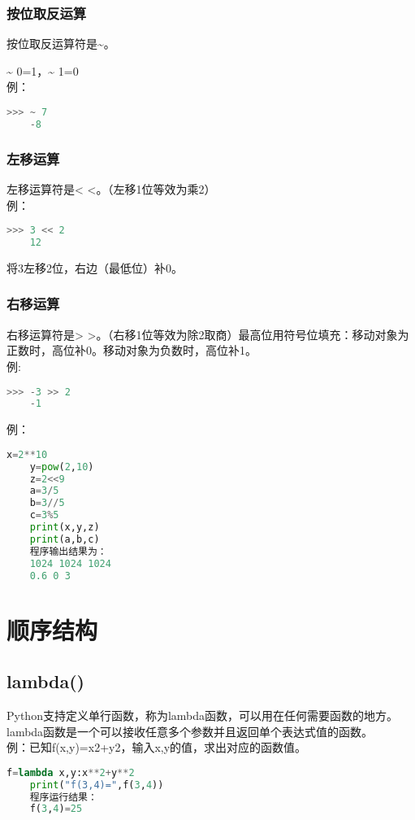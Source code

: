 \documentclass[11pt,a4paper]{article}
\begin{document}
\subsubsection{按位取反运算}

按位取反运算符是\~{}。

\~{} 0=1，\~{} 1=0\\
例：
\begin{lstlisting}[language={Python}]
    >>> ~ 7
    -8
\end{lstlisting}

\subsubsection{左移运算}

左移运算符是< <。（左移1位等效为乘2）\\
例：
\begin{lstlisting}[language={Python}]
    >>> 3 << 2
    12
\end{lstlisting}
将3左移2位，右边（最低位）补0。

\subsubsection{右移运算}

右移运算符是> >。（右移1位等效为除2取商）最高位用符号位填充：移动对象为正数时，高位补0。移动对象为负数时，高位补1。\\
例:
\begin{lstlisting}[language={Python}]
    >>> -3 >> 2
    -1
\end{lstlisting}
例：
\begin{lstlisting}[language={Python}]
    x=2**10
    y=pow(2,10)
    z=2<<9
    a=3/5
    b=3//5
    c=3%5
    print(x,y,z)
    print(a,b,c)
    程序输出结果为：
    1024 1024 1024
    0.6 0 3
\end{lstlisting}
\newpage

\section{顺序结构}

\subsection{lambda()}

Python支持定义单行函数，称为lambda函数，可以用在任何需要函数的地方。lambda函数是一个可以接收任意多个参数并且返回单个表达式值的函数。\\
例：已知f(x,y)=x2+y2，输入x,y的值，求出对应的函数值。
\begin{lstlisting}[language={Python}]
    f=lambda x,y:x**2+y**2
    print("f(3,4)=",f(3,4))
    程序运行结果：
    f(3,4)=25
\end{lstlisting}
\end{document}
